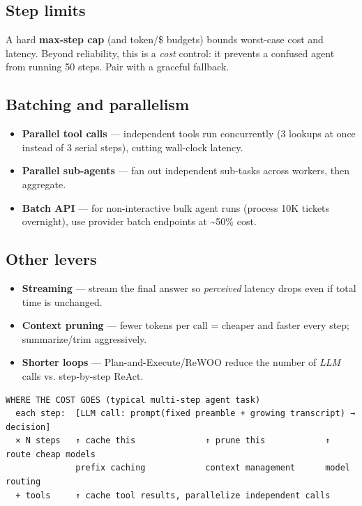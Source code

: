 \documentclass[11pt]{article}
\providecommand{\tightlist}{\setlength{\itemsep}{1pt}\setlength{\parskip}{0pt}}
\begin{document}
\subsection{Step limits}\label{step-limits}

A hard \textbf{max-step cap} (and token/\$ budgets) bounds worst-case cost and latency. Beyond reliability, this is a \emph{cost} control: it prevents a confused agent from running 50 steps. Pair with a graceful fallback.

\subsection{Batching and parallelism}\label{batching-and-parallelism}

\begin{itemize}
\tightlist
\item
  \textbf{Parallel tool calls} --- independent tools run concurrently (3 lookups at once instead of 3 serial steps), cutting wall-clock latency.
\item
  \textbf{Parallel sub-agents} --- fan out independent sub-tasks across workers, then aggregate.
\item
  \textbf{Batch API} --- for non-interactive bulk agent runs (process 10K tickets overnight), use provider batch endpoints at \textasciitilde50\% cost.
\end{itemize}

\subsection{Other levers}\label{other-levers}

\begin{itemize}
\tightlist
\item
  \textbf{Streaming} --- stream the final answer so \emph{perceived} latency drops even if total time is unchanged.
\item
  \textbf{Context pruning} --- fewer tokens per call = cheaper and faster every step; summarize/trim aggressively.
\item
  \textbf{Shorter loops} --- Plan-and-Execute/ReWOO reduce the number of \emph{LLM} calls vs. step-by-step ReAct.
\end{itemize}

\setcodelang{}

\begin{verbatim}
WHERE THE COST GOES (typical multi-step agent task)
  each step:  [LLM call: prompt(fixed preamble + growing transcript) → decision]
  × N steps   ↑ cache this              ↑ prune this            ↑ route cheap models
              prefix caching            context management      model routing
  + tools     ↑ cache tool results, parallelize independent calls
\end{verbatim}
\end{document}
